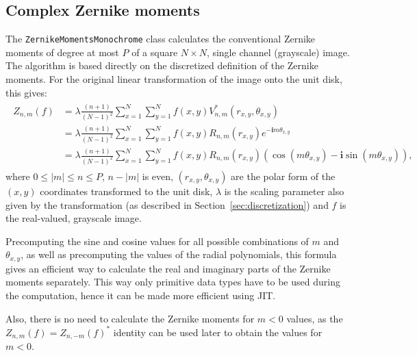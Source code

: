 \subsection{Complex Zernike moments}
The \texttt{ZernikeMomentsMonochrome} class calculates the conventional Zernike moments of degree at most $P$ of a square $N \times N$, single channel (grayscale) image. The algorithm is based directly on the discretized definition of the Zernike moments.
For the original linear transformation of the image onto the unit disk, this gives:
\begin{gather*}
    \begin{split}
    Z_{n,m}(f) &= \lambda\frac{(n+1)}{(N-1)^2}\sum_{x=1}^{N}\sum_{y=1}^{N}f(x,y)V_{n,m}^{*}(r_{x,y},\theta_{x,y}) \\
    &= \lambda\frac{(n+1)}{(N-1)^2}\sum_{x=1}^{N}\sum_{y=1}^{N}f(x,y)R_{n,m}(r_{x,y})e^{-\bm{i}m\theta_{x,y}} \\
    &= \lambda\frac{(n+1)}{(N-1)^2}\sum_{x=1}^{N}\sum_{y=1}^{N}f(x,y)R_{n,m}(r_{x,y})(\cos (m\theta_{x,y}) - \bm{i}\sin (m\theta_{x,y})),
    \end{split}
\end{gather*}
where $0\leq |m| \leq n \leq P$, $n - |m|$ is even, $(r_{x,y},\theta_{x,y})$ are the polar form of the $(x,y)$ coordinates transformed to the unit disk, $\lambda$ is the scaling parameter also given by the transformation (as described in Section~\ref{sec:discretization}) and $f$ is the real-valued, grayscale image.

Precomputing the sine and cosine values for all possible combinations of $m$ and $\theta_{x,y}$, as well as precomputing the values of the radial polynomials, this formula gives an efficient way to calculate the real and imaginary parts of the Zernike moments separately. This way only primitive data types have to be used during the computation, hence it can be made more efficient using JIT.

Also, there is no need to calculate the Zernike moments for $m < 0$ values, as the $Z_{n,m}(f) = Z_{n,-m}(f)^{*}$ identity can be used later to obtain the values for $m < 0$.


